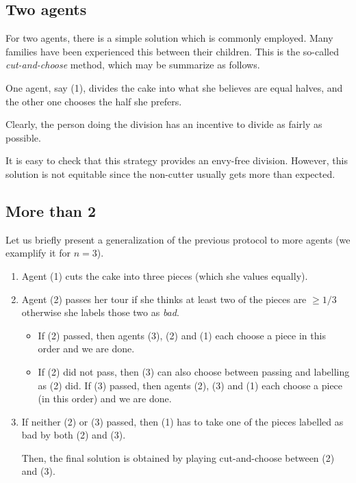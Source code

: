 \subsection{Two agents}

For two agents, there is a simple solution which is commonly employed.
Many families have been experienced this between their children. 
This is the so-called \textit{cut-and-choose} method, which may be summarize as follows.

One agent, say (1), divides the cake into what she believes are equal halves, and the other one chooses the half she prefers. 

Clearly, the person doing the division has an incentive to divide as fairly as possible. 

It is easy to check that this strategy provides an envy-free division.
However, this solution is not equitable since the non-cutter usually gets more than expected.


\subsection{More than 2}

Let us briefly present a generalization of the previous protocol to more agents
(we examplify it for $n=3$). 

\begin{enumerate}
\item 
Agent (1) cuts the cake into three pieces (which she values equally).
\item 
Agent (2) passes her tour if she thinks at least two of the pieces are $\geq 1/3$ otherwise she labels those two as \textit{bad}. 
\begin{itemize}
\item 
If (2) passed, then agents (3), (2) and (1) each choose a piece in this order and we are done.
\item 
If (2) did not pass, then (3) can also choose between passing and labelling as (2) did. 
If (3) passed, then agents (2), (3) and (1) each choose a piece (in this order) and we are done.
\end{itemize}
\item 
If neither (2) or (3) passed, then (1) has to take one of the pieces labelled as bad by both (2) and (3).

Then, the final solution is obtained by playing cut-and-choose between (2) and (3).
\end{enumerate}


